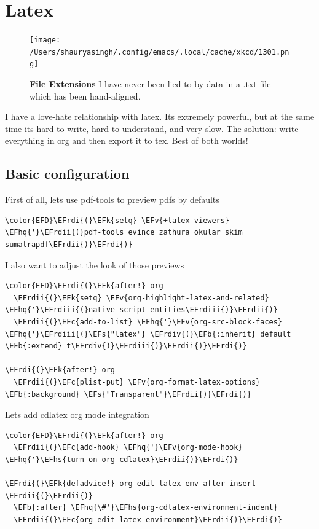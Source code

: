 \documentclass{scrartcl}
\newcommand{\EFk}[1]{\textcolor{EFk}{#1}} %
\newcommand{\EFs}[1]{\textcolor{EFs}{#1}} %
\newcommand{\EFb}[1]{\textcolor{EFb}{#1}} %
\newcommand{\EFc}[1]{\textcolor{EFc}{#1}} %
\newcommand{\EFv}[1]{\textcolor{EFv}{#1}} %
\newcommand{\EFhq}[1]{#1} %
\newcommand{\EFhs}[1]{#1} %
\newcommand{\EFrdi}[1]{#1} %
\newcommand{\EFrdii}[1]{#1} %
\newcommand{\EFrdiii}[1]{#1} %
\newcommand{\EFrdiv}[1]{#1} %
\begin{document}
\section{Latex}
\label{sec:org5b4f793}
\begin{figure}[!htb]
	  \centering
	  \texttt{[image: /Users/shauryasingh/.config/emacs/.local/cache/xkcd/1301.png]}
  \caption*{\label{xkcd:1301} \textbf{File Extensions} I have never been lied to by data in a .txt file which has been hand-aligned.}
	\end{figure}
I have a love-hate relationship with latex. Its extremely powerful, but at the
same time its hard to write, hard to understand, and very slow. The solution:
write everything in org and then export it to tex. Best of both worlds!

\subsection{Basic configuration}
\label{sec:orgcffb40c}
First of all, lets use pdf-tools to preview pdfs by defaults
\begin{Code}
\begin{Verbatim}[]
\color{EFD}\EFrdi{(}\EFk{setq} \EFv{+latex-viewers} \EFhq{'}\EFrdii{(}pdf-tools evince zathura okular skim sumatrapdf\EFrdii{)}\EFrdi{)}
\end{Verbatim}
\end{Code}

I also want to adjust the look of those previews
\begin{Code}
\begin{Verbatim}[]
\color{EFD}\EFrdi{(}\EFk{after!} org
  \EFrdii{(}\EFk{setq} \EFv{org-highlight-latex-and-related} \EFhq{'}\EFrdiii{(}native script entities\EFrdiii{)}\EFrdii{)}
  \EFrdii{(}\EFc{add-to-list} \EFhq{'}\EFv{org-src-block-faces} \EFhq{'}\EFrdiii{(}\EFs{"latex"} \EFrdiv{(}\EFb{:inherit} default \EFb{:extend} t\EFrdiv{)}\EFrdiii{)}\EFrdii{)}\EFrdi{)}

\EFrdi{(}\EFk{after!} org
  \EFrdii{(}\EFc{plist-put} \EFv{org-format-latex-options} \EFb{:background} \EFs{"Transparent"}\EFrdii{)}\EFrdi{)}
\end{Verbatim}
\end{Code}

Lets add cdlatex org mode integration
\begin{Code}
\begin{Verbatim}[]
\color{EFD}\EFrdi{(}\EFk{after!} org
  \EFrdii{(}\EFc{add-hook} \EFhq{'}\EFv{org-mode-hook} \EFhq{'}\EFhs{turn-on-org-cdlatex}\EFrdii{)}\EFrdi{)}

\EFrdi{(}\EFk{defadvice!} org-edit-latex-emv-after-insert \EFrdii{(}\EFrdii{)}
  \EFb{:after} \EFhq{\#'}\EFhs{org-cdlatex-environment-indent}
  \EFrdii{(}\EFc{org-edit-latex-environment}\EFrdii{)}\EFrdi{)}
\end{Verbatim}
\end{Code}
\end{document}
